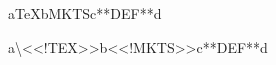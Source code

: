 
\mktsShowpar\par
a\TeX{}b{\mktsStyleBold{}MKTS}c**DEF**d\mktsShowpar\par
{\mktsStyleCode{}a\textbackslash{}<<!TEX>>b<<!MKTS>>c**DEF**d}\mktsShowpar\par


